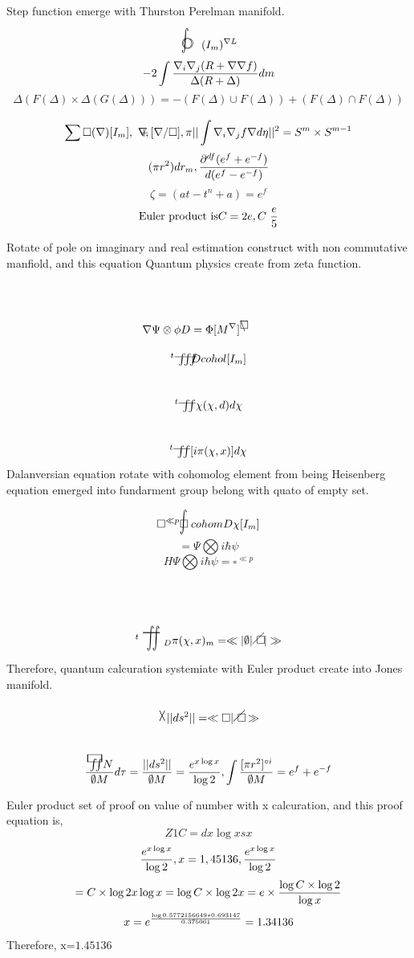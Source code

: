 \documentclass{jsarticle}
\begin{document}
	 Step function emerge with Thurston Perelman manifold.
	$$ \whitewithbodercircleint (I_m)^{\nabla L} $$
	$$ -2\int{{\nabla_{i}\nabla_{j} (R + \nabla\nabla f)} \over
	{\Delta(R + \Delta)}}dm $$
	$$ \Delta(F(\Delta) \times \Delta(G(\Delta))) = - (F(\Delta) \cup
	F(\Delta)) + (F(\Delta) \cap F(\Delta)) $$
	$$ \sum \square(\nabla)[I_m], \secproduct,[\nabla / \square],
	\pi ||\int \nabla_{i}\nabla_{j} f \nabla d \eta||^2 = S^{m}
	\times S^{m-1} $$
	$$ (\pi r^2) dr_m, {{\partial^{df} (e^{f} + e^{-f})} \over {
		d(e^{f} - e^{-f})}} $$
	$$ \zeta = (at -t^n + a) = e^{f} $$
	$$ \text{Euler product is} C = 2e, C ~ {e \over 5} $$

	Rotate of pole on imaginary and real estimation construct with
	non commutative manfiold, and this equation Quantum physics
	create from zeta function.
  $$ \nabla \Psi \otimes \phi D = \Phi [M^{\nabla}]^{\scalebox{1}[1]
  {$\smallaverage$}} $$
  $$ {}^{t}\variiint Dcohol[I_m] $$
  $$ {}^{t}\variint \chi(\chi,d)d\chi $$
  $$ {}^{t}\variint [i\pi(\chi,x)]d\chi $$
  Dalanversian equation rotate with cohomolog element from being Heisenberg
  equation emerged into fundarment group belong with quato of empty set.
  $$ \square^{\ll p}\flowerletter cohom D\chi[I_m] $$
  $$ = \Psi\bigotimes i\hbar\psi $$
  $$ H\Psi \bigotimes i\hbar\psi = \square^{\ll p} $$
  $$ {}^{t}\scalebox{1.0}[2]{\variint}_{D} 
  \pi(\chi,x)_m = \ll |\emptyset | \alearletter| \gg $$

 Therefore, quantum calcuration systemiate with Euler product create into
 Jones manifold.
  $$ \scalebox{1.0}[2]{$\times$} ||ds^2|| = \ll \square | \alearletter \gg $$
  $$ {{\squareiint N} \over {\emptyset M}}d\tau  = {{||ds^2||} \over {\emptyset
   {M}}} = {e^{x\log x} \over {\log 2}}, \int{{ [\pi r^2]^{\circ i}} \over 
   {\emptyset M}} = e^{f} + e^{-f} $$
  
   Euler product set of proof on value of number with x calcuration,
   and this proof equation is,
   $$ Z 1 C = dx \log x s x $$
   $$ {e^{x\log x} \over {\log 2}}, x=1,45136, {e^{x\log x} \over {\log 2}}$$
   $$= C\times \log 2 x\log x = \log{C\times\log 2}x = e\times
   {\log{C\times\log 2}\over {\log x}}$$
   $$x = e^{\log{0.5772156649*0.693147}\over {0.375061}} = 1.34136 $$
   Therefore, $\text{x=1.45136}$
\end{document}
